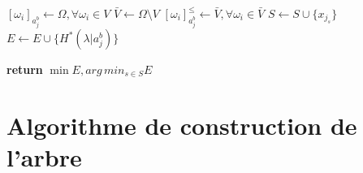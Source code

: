 \documentclass[a4paper]{article}
\begin{document}
\begin{algorithm}[H]
\begin{algorithmic}
    	\State $[\omega_i]_{a^{b}_j} \gets \Omega, \forall \omega_i \in V$
        \State $\bar{V} \gets \Omega \setminus V$ 
        \State $[\omega_i]^{\leq}_{a^{b}_j} \gets \bar{V}, \forall \omega_i \in \bar{V}$
        \State $S \gets S \cup \{x_{j_s}\}$
        \State $E \gets E \cup \{H^*(\lambda | a^{b}_j)\}$
    \EndIf
\EndFor

\State \textbf{return} $\min E, arg\,min_{s \in S} E $ 
\EndProcedure
\end{algorithmic}
\end{algorithm}

\section{Algorithme de construction de l'arbre}
\label{appendix:build-tree}
\end{document}
